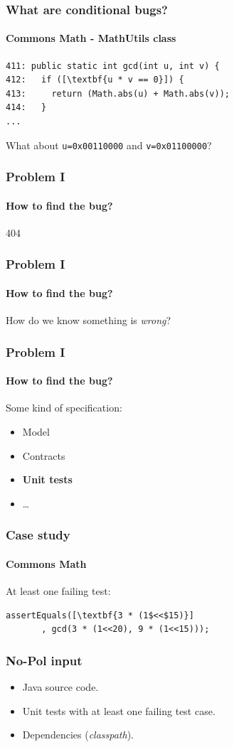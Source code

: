 \documentclass[onlymath]{beamer}
\begin{document}
\begin{frame}[fragile]
\frametitle{What are conditional bugs?}
\framesubtitle{Commons Math - MathUtils class}
    
\begin{lstlisting}[escapeinside=\[\]]
411: public static int gcd(int u, int v) {
412:   if ([\textbf{u * v == 0}]) {
413:     return (Math.abs(u) + Math.abs(v));
414:   }
...
\end{lstlisting}

\vspace{2em}

\centering What about \texttt{u=0x00110000} and  \texttt{v=0x01100000}?

\end{frame}

\begin{frame}
\frametitle{Problem I}
\framesubtitle{How to find the bug?}
\begin{center}
\Huge{404}
\end{center}
\end{frame}

\begin{frame}
\frametitle{Problem I}
\framesubtitle{How to find the bug?}
How do we know something is \textit{wrong}?
\end{frame}

\begin{frame}
\frametitle{Problem I}
\framesubtitle{How to find the bug?}
Some kind of specification:
\begin{itemize}
 \item Model
 \item Contracts
 \item \textbf{Unit tests}
 \item \dots
\end{itemize}
\end{frame}

\begin{frame}[fragile]
    \frametitle{Case study}
      \framesubtitle{Commons Math}
At least one failing test:
      
      \begin{lstlisting}[escapeinside=\[\]]
assertEquals([\textbf{3 * (1$<<$15)}]
       , gcd(3 * (1<<20), 9 * (1<<15)));
	\end{lstlisting}
\end{frame}

\begin{frame}
\frametitle{No-Pol input}
\begin{itemize}
 \item Java source code.
 \item Unit tests with at least one failing test case.
 \item Dependencies (\textit{classpath}).
\end{itemize}
\end{frame}
\end{document}
